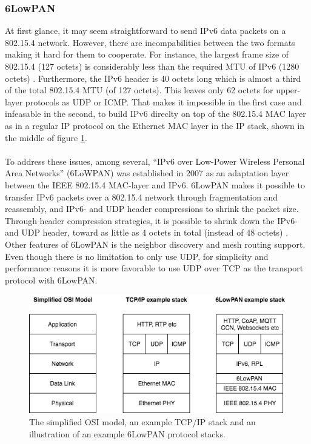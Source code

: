 
\subsubsection{6LowPAN}

At first glance, it may seem straightforward to send IPv6 data packets on a 802.15.4 network. However, there are incompabilities between the two formats making it hard for them to cooperate. For instance, the largest frame size of 802.15.4 (127 octets) is considerably less than the required MTU of IPv6 (1280 octets) \cite{rfc4944}. Furthermore, the IPv6 header is 40 octets long which is almost a third of the total 802.15.4 MTU (of 127 octets). This leaves only 62 octets for upper-layer protocols as UDP or ICMP. That makes it impossible in the first case and infeasable in the second, to build IPv6 direclty on top of the 802.15.4 MAC layer as in a regular IP protocol on the Ethernet MAC layer in the IP stack, shown in the middle of figure \ref{fig:ip-6lowpan-stack}.\\\\
To address these issues, among several, ``IPv6 over Low-Power Wireless Personal Area Networks'' (6LoWPAN) was established in 2007 as an adaptation layer between the IEEE 802.15.4 MAC-layer and IPv6. 6LowPAN makes it possible to transfer IPv6 packets over a 802.15.4 network through fragmentation and reassembly, and IPv6- and UDP header compressions to shrink the packet size. Through header compression strategies, it is possible to shrink down the IPv6- and UDP header, toward as little as 4 octets in total (instead of 48 octets) \cite{rfc4944}. Other features of 6LowPAN is the neighbor discovery and mesh routing support. Even though there is no limitation to only use UDP, for simplicity and performance reasons it is more favorable to use UDP over TCP as the transport protocol with 6LowPAN.


\begin{figure}
	\includegraphics[width=\textwidth]{figures/6lowpan-own.png}
	\caption{The simplified OSI model, an example TCP/IP stack and an illustration of an example 6LowPAN protocol stacks.}
	\label{fig:ip-6lowpan-stack}
\end{figure}

